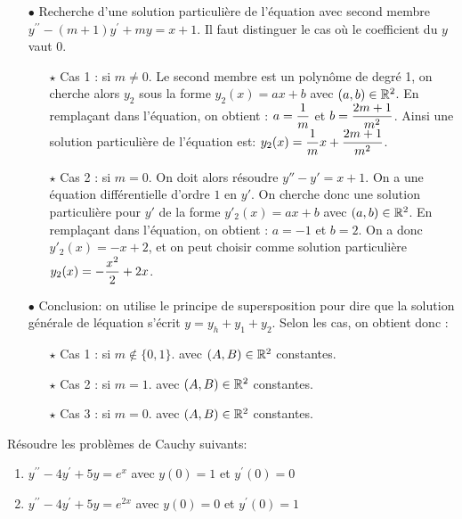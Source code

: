 \documentclass[a4paper, 11pt,reqno]{article}
\begin{document}
\begin{correction}
\begin{itemize}
\begin{itemize}
          \end{itemize}
    \item[$\bullet$] Recherche d'une solution particuli\`{e}re de l'\'equation avec second membre $y^{\prime\prime}-(m+1)y^{\prime}+my=x+1$. Il faut distinguer le cas o\`u le coefficient du $y$ vaut $0$.
          \begin{itemize}
            \item[$\star$] Cas 1 : si $m\not=0$. Le second membre est un polyn\^ome de degr\'e 1, on cherche alors $y_2$ sous la forme $y_2(x)=ax+b$ avec $(a,b)\in\mathbb{R}^2$. En rempla\c cant dans l'\'equation, on obtient : $a=\displaystyle \frac{1}{m}$ et $b=\displaystyle \frac{2m+1}{m^2}$.  Ainsi une solution particuli\`{e}re de l'\'equation est: $y_2(x)= \displaystyle\frac{1}{m} x + \frac{2m+1}{m^2}$.
            \item[$\star$] Cas 2 : si $m=0$. On doit alors r\'esoudre $y''-y'=x+1$. On a une \'equation diff\'erentielle d'ordre $1$ en $y'$. On cherche donc une solution particuli\`ere pour $y'$ de la forme $y'_2(x) = ax+b$  avec $(a,b)\in\mathbb{R}^2$. En rempla\c cant dans l'\'equation, on obtient : $a=-1$ et $b=2$. On a donc $y'_2(x) = -x+2$, et on peut choisir comme solution particuli\`ere $y_2(x) = -\displaystyle\frac{x^2}{2}+2x$.
          \end{itemize}
    \item[$\bullet$] Conclusion: on utilise le principe de supersposition pour dire que la solution g\'en\'erale de l\'equation s'\'ecrit $y=y_h + y_1 + y_2$. Selon les cas, on obtient donc :
          \begin{itemize}
            \item[$\star$] Cas 1 : si $m\not\in \{0,1\}$.   avec $(A,B)\in\mathbb{R}^2$ constantes.
            \item[$\star$] Cas 2 : si $m=1$.  avec $(A,B)\in\mathbb{R}^2$ constantes.
            \item[$\star$] Cas 3 : si $m=0$.  avec $(A,B)\in\mathbb{R}^2$ constantes.
          \end{itemize}
  \end{itemize}

\end{correction}
\begin{exercice}  \;
  R\'esoudre les probl\`emes de Cauchy suivants:
  \begin{enumerate}
    \item $y^{\prime\prime}-4y^{\prime}+5y=e^x$ avec $y(0)=1$ et $y^{\prime}(0)=0$
    \item $y^{\prime\prime}-4y^{\prime}+5y=e^{2x}$ avec $y(0)=0$ et $y^{\prime}(0)=1$
  \end{enumerate}
\end{exercice}
\end{document}
